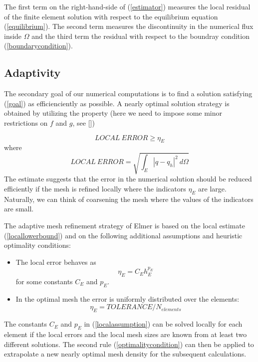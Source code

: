 \begin{versiona}
The first term on the right-hand-side of (\ref{estimator}) measures the
local residual of the finite element solution with respect to the equilibrium
equation (\ref{equilibrium}). The second term measures the discontinuity in
the numerical flux inside $\Omega$ and the third term the residual with respect
to the boundray condition (\ref{boundarycondition}).

\subsection{Adaptivity}

The secondary goal of our numerical computations is to find a solution
satisfying (\ref{goal}) as efficienciently as possible. A nearly optimal
solution strategy is obtained by utilizing the property (here we need to
impose some minor restrictions on $f$ and $g$, see [])

\begin{equation}
LOCAL \ ERROR \ge \eta_E \label{locallowerbound}
\end{equation}
where 
\begin{equation}
LOCAL \ ERROR = \sqrt{ \int_E |q-q_h|^2 \ d\Omega}
\end{equation}
The estimate suggests that the error in the numerical solution should
be reduced efficiently if the mesh is refined locally where the indicators
$\eta_E$ are large. Naturally, we can think of coarsening the mesh where
the values of the indicators are small.

The adaptive mesh refinement strategy of Elmer is based on the local
estimate (\ref{locallowerbound}) and on the following additional assumptions
and heuristic optimality conditions:
\begin{itemize}
\item The local error behaves as
\begin{equation}
\eta_E = C_E h_E^{p_E} \label{localassumption}
\end{equation}
for some constants $C_E$ and $p_E$.
\item In the optimal mesh the error is uniformly distributed over the elements:
\begin{equation}
\eta_E = TOLERANCE / N_{elements} \label{optimalitycondition}
\end{equation}
\end{itemize}

The constants $C_E$ and $p_E$ in (\ref{localassumption}) can be solved locally
for each element if the local errors and the local mesh sizes are known from
at least two different solutions. The second rule (\ref{optimalitycondition})
can then be applied to extrapolate a new nearly optimal mesh density for the
subsequent calculations. 


\end{versiona}
